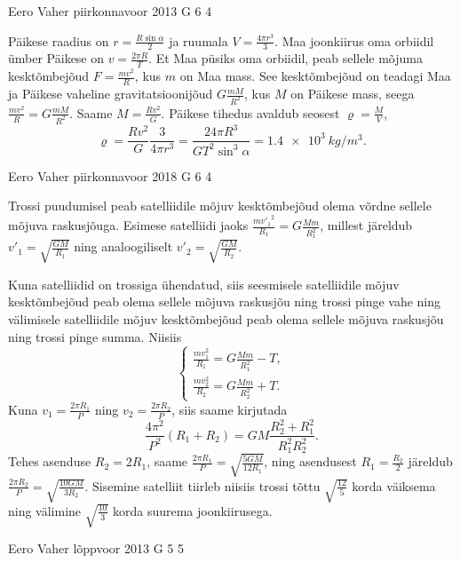 \documentclass[11pt, twoside]{article}
\begin{document}
{%
{Eero Vaher} %
{piirkonnavoor} %
{2013} %
{G 6} %
{4} %
{

\ifSolution
Päikese raadius on $r=\frac{R\sin\alpha}{2}$ ja ruumala $V=\frac{4\pi r^3}{3}$.
Maa joonkiirus oma orbiidil ümber Päikese on $v=\frac{2\pi R}{T}$. Et Maa püsiks oma orbiidil, peab sellele mõjuma kesktõmbejõud $F=\frac{mv^2}{R}$, kus $m$ on Maa mass. See kesktõmbejõud on teadagi Maa ja Päikese vaheline gravitatsioonijõud $G\frac{mM}{R^2}$, kus $M$ on Päikese mass, seega $\frac{mv^2}{R}=G\frac{mM}{R^2}$. Saame $M=\frac{Rv^2}{G}$.
Päikese tihedus avaldub seosest $\varrho=\frac{M}{V}$, $$\varrho=\frac{Rv^2}{G} \frac{3}{4\pi r^3}=\frac{24 \pi R^3}{G T^2 \sin^3 \alpha}=\SI{1,4e3}{kg/m^3}.$$
\fi
}

{Eero Vaher} %
{piirkonnavoor} %
{2018} %
{G 6} %
{4} %
{

\ifSolution
Trossi puudumisel peab satelliidile mõjuv kesktõmbejõud olema võrdne sellele mõjuva raskusjõuga. Esimese satelliidi jaoks $\frac{{mv'_1}^2}{R_1}=G\frac{Mm}{R_1^2}$, millest järeldub $v'_1=\sqrt{\frac{GM}{R_1}}$ ning analoogiliselt $v'_2=\sqrt{\frac{GM}{R_2}}$.

Kuna satelliidid on trossiga ühendatud, siis seesmisele satelliidile mõjuv kesktõmbejõud peab olema sellele mõjuva raskusjõu ning trossi pinge vahe ning välimisele satelliidile mõjuv kesktõmbejõud peab olema sellele mõjuva raskusjõu ning trossi pinge summa. Niisiis
$$\begin{cases}
\frac{mv_1^2}{R_1}=G\frac{Mm}{R_1^2}-T,\\
\frac{mv_2^2}{R_2}=G\frac{Mm}{R_2^2}+T.
\end{cases}$$ 
Kuna $v_1=\frac{2\pi R_1}{P}$ ning $v_2=\frac{2\pi R_2}{P}$, siis saame kirjutada
$$\frac{4\pi^2}{P^2}\left(R_1+R_2\right)=GM\frac{R_2^2+R_1^2}{R_1^2R_2^2}.$$
Tehes asenduse $R_2=2R_1$, saame  $\frac{2\pi R_1}{P}=\sqrt{\frac{5GM}{12R_1}}$, ning asendusest $R_1=\frac{R_2}{2}$ järeldub $\frac{2\pi R_2}{P}=\sqrt{\frac{10GM}{3R_2}}$. Sisemine satelliit tiirleb niisiis trossi tõttu $\sqrt{\frac{12}{5}}$ korda väiksema ning välimine $\sqrt{\frac{10}{3}}$ korda suurema joonkiirusega.
\fi
}

{Eero Vaher} %
{lõppvoor} %
{2013} %
{G 5} %
{5} %
{

}}
\end{document}
